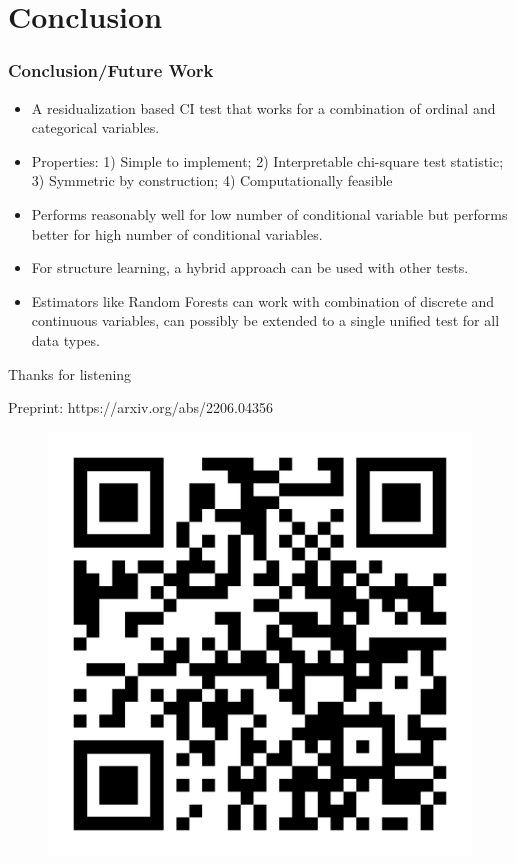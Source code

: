 \documentclass{beamer}
\begin{document}

\section{Conclusion}
\begin{frame}
	\frametitle{Conclusion/Future Work}
	\begin{itemize}
		\setlength\itemsep{1em}
		\item A residualization based CI test that works for a
			combination of ordinal and categorical variables.
		\item Properties: 1) Simple to implement; 2) Interpretable
			chi-square test statistic; 3) Symmetric by
			construction; 4) Computationally feasible
		\item Performs reasonably well for low number of conditional
			variable but performs better for high number of
			conditional variables.
		\item For structure learning, a hybrid approach can be used
			with other tests.
		\item Estimators like Random Forests can work with combination
			of discrete and continuous variables, can possibly be
			extended to a single unified test for all data types.
	\end{itemize}
\end{frame}

\begin{frame}
	\begin{center}
		\Huge{Thanks for listening}
	\end{center}
	\begin{center}
		Preprint: https://arxiv.org/abs/2206.04356
		\begin{figure}
			\includegraphics[scale=0.07]{imgs/qr-code.pdf}
		\end{figure}
	\end{center}
\end{frame}
\end{document}
